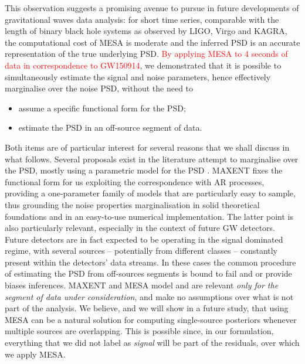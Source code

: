 \documentclass{aa}
\begin{document}
This observation suggests a promising avenue to pursue in future developments of gravitational waves data analysis: for short time series, comparable with the length of binary black hole systems as observed by LIGO, Virgo and KAGRA, the computational cost of MESA is moderate and the inferred PSD is an accurate representation of the true underlying PSD. \textcolor{red}{By applying MESA to 4 seconds of data in correspondence to GW150914}, we demonstrated that it is possible to simultaneously estimate the signal and noise parameters, hence effectively marginalise over the noise PSD, without the need to 
\begin{itemize}
\item assume a specific functional form for the PSD;
\item estimate the PSD in an off-source segment of data.
\end{itemize}
Both items are of particular interest for several reasons that we shall discuss in what follows. Several proposals exist in the literature attempt to marginalise over the PSD, mostly using a parametric model for the PSD \citep{Littenberg_2013, Edwards_2015, lalinference}. MAXENT fixes the functional form for us exploiting the correspondence with AR processes, providing a one-parameter family of models that are particularly easy to sample, thus grounding the noise properties marginalisation in solid theoretical foundations and in an easy-to-use numerical implementation. The latter point is also particularly relevant, especially in the context of future GW detectors. Future detectors are in fact expected to be operating in the signal dominated regime, with several sources -- potentially from different classes -- constantly present within the detectors' data streams. In these cases the common procedure of estimating the PSD from off-sources segments is bound to fail and or provide biases inferences. MAXENT and MESA model and are relevant \emph{only for the segment of data under consideration}, and make no assumptions over what is not part of the analysis. We believe, and we will show in a future study, that using MESA can be a natural solution for computing single-source posteriors whenever multiple sources are overlapping. This is possible since, in our formulation, everything that we did not label as \emph{signal} will be part of the residuals, over which we apply MESA. 
\end{document}
